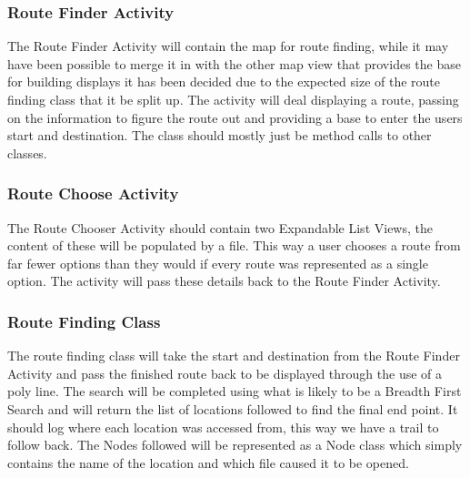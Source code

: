 \subsubsection{Route Finder Activity}
The Route Finder Activity will contain the map for route finding, while it may have been possible to merge it in with the other map view that provides the base for building displays it has been decided due to the expected size of the route finding class that it be split up. The activity will deal displaying a route, passing on the information to figure the route out and providing a base to enter the users start and destination. The class should mostly just be method calls to other classes.
\subsubsection{Route Choose Activity}
The Route Chooser Activity should contain two Expandable List Views, the content of these will be populated by a file. This way a user chooses a route from far fewer options than they would if every route was represented as a single option. The activity will pass these details back to the Route Finder Activity.
\subsubsection{Route Finding Class}
The route finding class will take the start and destination from the Route Finder Activity and pass the finished route back to be displayed through the use of a poly line. The search will be completed using what is likely to be a Breadth First Search and will return the list of locations followed to find the final end point. It should log where each location was accessed from, this way we have a trail to follow back. The Nodes followed will be represented as a Node class which simply contains the name of the location and which file caused it to be opened.
